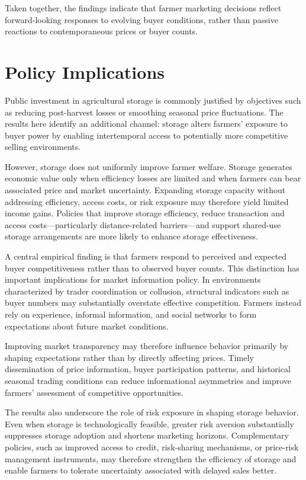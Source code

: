 Taken together, the findings indicate that farmer marketing decisions reflect forward-looking responses to evolving buyer conditions, rather than passive reactions to contemporaneous prices or buyer counts.

\section{Policy Implications}
\noindent
Public investment in agricultural storage is commonly justified by objectives such as reducing post-harvest losses or smoothing seasonal price fluctuations. The results here identify an additional channel: storage alters farmers' exposure to buyer power by enabling intertemporal access to potentially more competitive selling environments.

However, storage does not uniformly improve farmer welfare. Storage generates economic value only when efficiency losses are limited and when farmers can bear associated price and market uncertainty. Expanding storage capacity without addressing efficiency, access costs, or risk exposure may therefore yield limited income gains. Policies that improve storage efficiency, reduce transaction and access costs---particularly distance-related barriers---and support shared-use storage arrangements are more likely to enhance storage effectiveness.

A central empirical finding is that farmers respond to perceived and expected buyer competitiveness rather than to observed buyer counts. This distinction has important implications for market information policy. In environments characterized by trader coordination or collusion, structural indicators such as buyer numbers may substantially overstate effective competition. Farmers instead rely on experience, informal information, and social networks to form expectations about future market conditions.

Improving market transparency may therefore influence behavior primarily by shaping expectations rather than by directly affecting prices. Timely dissemination of price information, buyer participation patterns, and historical seasonal trading conditions can reduce informational asymmetries and improve farmers' assessment of competitive opportunities.

The results also underscore the role of risk exposure in shaping storage behavior. Even when storage is technologically feasible, greater risk aversion substantially suppresses storage adoption and shortens marketing horizons. Complementary policies, such as improved access to credit, risk-sharing mechanisms, or price-risk management instruments, may therefore strengthen the efficiency of storage and enable farmers to tolerate uncertainty associated with delayed sales better.

